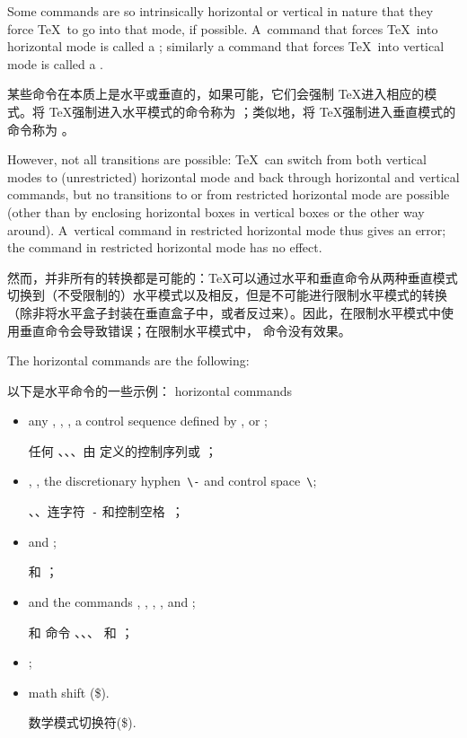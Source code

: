 Some commands are so intrinsically horizontal or vertical
in nature that they force \TeX\ to go into that mode, if
possible. A~command that forces \TeX\ into horizontal mode
is called a ; similarly a command that
forces \TeX\ into vertical mode is called a
\awp
{}.

某些命令在本质上是水平或垂直的，如果可能，它们会强制 \TeX 进入相应的模式。将 \TeX 强制进入水平模式的命令称为 ；类似地，将 \TeX 强制进入垂直模式的命令称为 。

However, not all transitions are possible:
\TeX\ can switch from both vertical modes to 
(unrestricted) horizontal mode and back
through horizontal and vertical commands, but no transitions
to or from restricted horizontal mode are possible
(other than by enclosing horizontal boxes in vertical boxes or
the other way around).
A~vertical command in restricted horizontal mode thus gives
an error; the  command in restricted horizontal mode
has no effect.

然而，并非所有的转换都是可能的：\TeX 可以通过水平和垂直命令从两种垂直模式切换到（不受限制的）水平模式以及相反，但是不可能进行限制水平模式的转换（除非将水平盒子封装在垂直盒子中，或者反过来）。因此，在限制水平模式中使用垂直命令会导致错误；在限制水平模式中， 命令没有效果。

The horizontal commands are the following:

以下是水平命令的一些示例：
\label{h:com:list}\term horizontal commands\par
\begin{itemize}
\item any , , , 
a control sequence defined by , or ;

任何 、、、由  定义的控制序列或 ；
\item {}, , the discretionary
hyphen~\verb|\-| and control space~\verb|\|;

、、连字符~\verb|-| 和控制空格~\verb||；
\item {} and ;

 和 ；
\item {} and the
 commands
, , , , and ;

 和  命令 、、、 和 ；
\item {};
\item math shift (\n\$).

数学模式切换符(\n\$).
\end{itemize}

